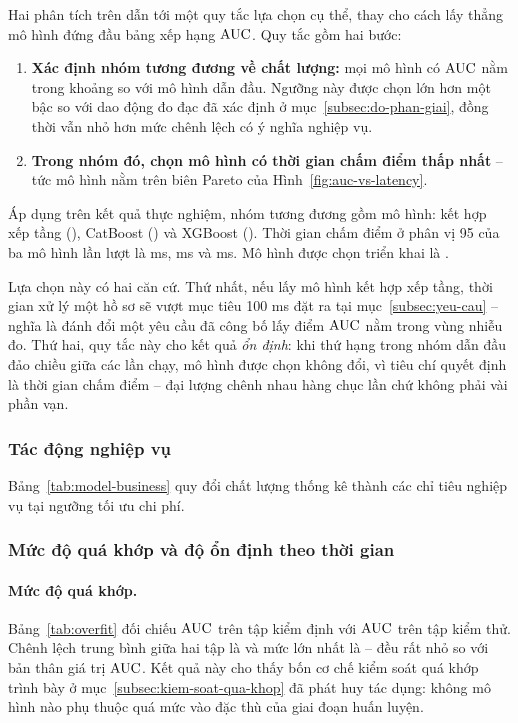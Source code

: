 Hai phân tích trên dẫn tới một quy tắc lựa chọn cụ thể, thay cho cách lấy thẳng
mô hình đứng đầu bảng xếp hạng $\mathrm{AUC}$. Quy tắc gồm hai bước:

\begin{enumerate}[label=(\arabic*)]
  \item \textbf{Xác định nhóm tương đương về chất lượng:} mọi mô hình có $\mathrm{AUC}$
  nằm trong khoảng \TieTolerance{} so với mô hình dẫn đầu. Ngưỡng này được chọn
  lớn hơn một bậc so với dao động đo đạc đã xác định ở
  mục~\ref{subsec:do-phan-giai}, đồng thời vẫn nhỏ hơn mức chênh lệch có ý nghĩa
  nghiệp vụ.
  \item \textbf{Trong nhóm đó, chọn mô hình có thời gian chấm điểm thấp nhất} --
  tức mô hình nằm trên biên Pareto của Hình~\ref{fig:auc-vs-latency}.
\end{enumerate}

Áp dụng trên kết quả thực nghiệm, nhóm tương đương gồm \NTiedModels{} mô hình:
kết hợp xếp tầng (\TopAUC{}), CatBoost (\CatAUC{}) và XGBoost (\XGBAUC{}). Thời
gian chấm điểm ở phân vị 95 của ba mô hình lần lượt là \StackLat{} ms,
\CatLat{} ms và \XGBLat{} ms. Mô hình được chọn triển khai là \BestModel{}.

Lựa chọn này có hai căn cứ. Thứ nhất, nếu lấy mô hình kết hợp xếp tầng, thời gian
xử lý một hồ sơ sẽ vượt mục tiêu 100 ms đặt ra tại
mục~\ref{subsec:yeu-cau} -- nghĩa là đánh đổi một yêu cầu đã công bố lấy
\GapTopDeploy{} điểm $\mathrm{AUC}$ nằm trong vùng nhiễu đo. Thứ hai, quy tắc này cho kết
quả \textit{ổn định}: khi thứ hạng trong nhóm dẫn đầu đảo chiều giữa các lần chạy,
mô hình được chọn không đổi, vì tiêu chí quyết định là thời gian chấm điểm --
đại lượng chênh nhau hàng chục lần chứ không phải vài phần vạn.

\subsubsection{Tác động nghiệp vụ}

Bảng~\ref{tab:model-business} quy đổi chất lượng thống kê thành các chỉ tiêu
nghiệp vụ tại ngưỡng tối ưu chi phí.



\subsubsection{Mức độ quá khớp và độ ổn định theo thời gian}
\label{subsec:kq-on-dinh}

\paragraph{Mức độ quá khớp.} Bảng~\ref{tab:overfit} đối chiếu $\mathrm{AUC}$ trên tập
kiểm định với $\mathrm{AUC}$ trên tập kiểm thử. Chênh lệch trung bình giữa hai tập là
\MeanOverfitGap{} và mức lớn nhất là \MaxOverfitGap{} -- đều rất nhỏ so với bản
thân giá trị $\mathrm{AUC}$. Kết quả này cho thấy bốn cơ chế kiểm soát quá khớp trình bày
ở mục~\ref{subsec:kiem-soat-qua-khop} đã phát huy tác dụng: không mô hình nào phụ
thuộc quá mức vào đặc thù của giai đoạn huấn luyện.

